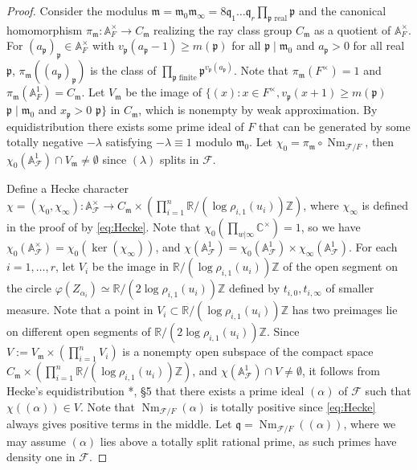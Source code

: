 \documentclass{amsart}
\numberwithin{equation}{subsection}
\numberwithin{theorem}{section}
\theoremstyle{definition}
\theoremstyle{remark}
\newcommand{\bA}{\mathbb{A}}
\newcommand{\bC}{\mathbb{C}}
\newcommand{\bR}{\mathbb{R}}
\newcommand{\bZ}{\mathbb{Z}}
\newcommand{\cF}{\mathcal{F}}
\newcommand{\fm}{\mathfrak{m}}
\newcommand{\fp}{\mathfrak{p}}
\newcommand{\fq}{\mathfrak{q}}
\DeclareMathOperator{\Nm}{Nm}
\begin{document}
\begin{proof}
    Consider the modulus $\fm = \fm_0\fm_{\infty} = 8\fq_1\dotsc\fq_r\prod_{\fp\text{ real}}\fp$ and the canonical homomorphism $\pi_{\fm}:\bA_{F}^\times \to C_{\fm}$ realizing the ray class group $C_{\fm}$ as a quotient of $\bA_{F}^\times$. 
    For $(a_{\fp})_{\fp}\in \bA_F^\times$ with $v_{\fp}(a_{\fp}-1) \geq m(\fp)$ for all $\fp \mid \fm_0$ and $a_{\fp}>0$ for all real $\fp$, $\pi_{\fm}((a_{\fp})_{\fp})$ is the class of $\prod_{\fp \text{ finite}} \fp^{v_{\fp}(a_{\fp})}$.
    Note that $\pi_{\fm}(F^\times) = 1$ and $\pi_{\fm}(\bA_F^1) = C_{\fm}$. 
    Let $V_{\fm}$ be the image of $\{(x):x\in F^\times, v_{\fp}(x+1) \geq m(\fp)$  $\fp \mid \fm_0$ and $x_{\fp} > 0$  $\fp\}$ in $C_{\fm}$, which is nonempty by weak approximation. By equidistribution there exists some prime ideal of $F$ that can be generated by some totally negative $-\lambda$ satisfying $-\lambda\equiv 1$ modulo $\fm_0$. Let  $\chi_0 =  \pi_{\fm}\circ \Nm_{\cF/F}$, then $\chi_0(\bA_\cF^1)\cap V_{\fm}\neq \emptyset$ since $(\lambda)$ splits in $\cF$. 
    
    Define a Hecke character $\chi = (\chi_0, \chi_{\infty}):\bA_{\cF}^\times \to C_{\fm} \times \left(\prod_{i=1}^n\bR/(\log \rho_{i,1}(u_i)) \bZ\right)$, where $\chi_{\infty}$ is defined in the proof of  by \eqref{eq:Hecke}. Note that $\chi_0(\prod_{w|\infty} \bC^\times) = 1$, so we have $\chi_0(\bA_\cF^\times) = \chi_0(\ker(\chi_\infty))$, and  $\chi(\bA_\cF^1) = \chi_0(\bA_\cF^1)\times \chi_{\infty}(\bA_\cF^1)$. 
    For each $i=1, \dotsc, r$, let $V_i$ be the image in $\bR/(\log \rho_{i,1}(u_i)) \bZ$ of the open segment on the circle $ \varphi(Z_{\alpha_i}) \simeq \mathbb{R}/(2\log \rho_{i,1}(u_i))\bZ $ defined by $t_{i,0}, t_{i, \infty}$ of smaller measure. Note that a point in $V_i\subset \bR/(\log \rho_{i,1}(u_i)) \bZ$ has two preimages lie on different open segments of $\bR/(2\log \rho_{i,1}(u_i)) \bZ$. 
    Since $V:= V_{\fm}\times (\prod_{i=1}^n V_i)$ is a nonempty open subspace of the compact space $C_{\fm}\times \left(\prod_{i=1}^n\bR/(\log \rho_{i,1}(u_i)) \bZ\right) $, and $\chi(\bA_{\cF}^1) \cap V \neq \emptyset$, it follows from Hecke's equidistribution \cite{MR1282723}*{\MakeUppercase{}, \S5} that there exists a prime ideal $(\alpha)$ of $\cF$ such that $\chi((\alpha)) \in V$. Note that $\Nm_{\cF/F}(\alpha)$ is totally positive since \eqref{eq:Hecke} always gives positive terms in the middle. Let $\fq = \Nm_{\cF/F}((\alpha))$, where we may assume $(\alpha)$ lies above a totally split rational prime, as such primes have density one in $\cF$. 
\end{proof}
\end{document}
